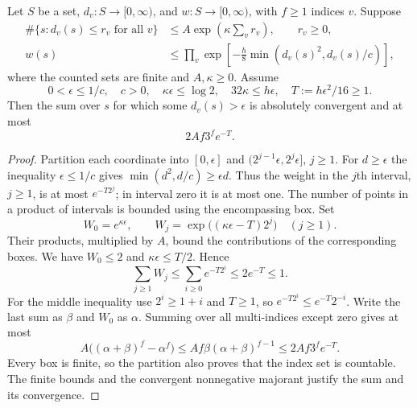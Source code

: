 \begin{lemma}\label{amb-shells}
Let $S$ be a set, $d_v:S\to[0,\infty)$, and
$w:S\to[0,\infty)$, with $f\ge1$ indices $v$. Suppose
\begin{align*}
 \#\{s:d_v(s)\le r_v\text{ for all }v\}
                 &\le A\exp(\kappa\sum_vr_v),\qquad r_v\ge0,\\
 w(s)&\le\prod_v\exp\left[-\frac h8
                              \min(d_v(s)^2,d_v(s)/c)\right],
\end{align*}
where the counted sets are finite and $A,\kappa\ge0$.
Assume
\begin{equation}\label{amb-shell-hypotheses}
 0<\epsilon\le1/c,\quad c>0,\quad
 \kappa\epsilon\le\log2,\quad
 32\kappa\le h\epsilon,\quad
                     T:=h\epsilon^2/16\ge1.
\end{equation}
Then the sum over $s$ for which some $d_v(s)>\epsilon$ is
absolutely convergent and at most
\begin{equation}\label{amb-shell-bound}
                          2Af3^f e^{-T}.
\end{equation}
\end{lemma}
\begin{proof}
Partition each coordinate into $[0,\epsilon]$ and
$(2^{j-1}\epsilon,2^j\epsilon]$, $j\ge1$.
For $d\ge\epsilon$ the inequality $\epsilon\le1/c$ gives
$\min(d^2,d/c)\ge\epsilon d$. Thus the weight in the $j$th
interval, $j\ge1$, is at most $e^{-T2^j}$; in interval zero it
is at most one. The number of points in a product of intervals
is bounded using the encompassing box. Set
\[
 W_0=e^{\kappa\epsilon},\qquad
 W_j=\exp\bigl((\kappa\epsilon-T)2^j\bigr)\quad(j\ge1).
\]
Their products, multiplied by $A$, bound the contributions of
the corresponding boxes. We have $W_0\le2$ and
$\kappa\epsilon\le T/2$. Hence
\[
       \sum_{j\ge1}W_j
           \le\sum_{i\ge0}e^{-T2^i}\le2e^{-T}\le1.
\]
For the middle inequality use $2^i\ge1+i$ and $T\ge1$, so
$e^{-T2^i}\le e^{-T}2^{-i}$. Write the last sum as $\beta$
and $W_0$ as $\alpha$. Summing over all multi-indices except
zero gives at most
\[
 A\bigl((\alpha+\beta)^f-\alpha^f\bigr)
       \le Af\beta(\alpha+\beta)^{f-1}
       \le2Af3^f e^{-T}.
\]
Every box is finite, so the partition also proves that the
index set is countable. The finite bounds and the convergent
nonnegative majorant justify the sum and its convergence.
\end{proof}


